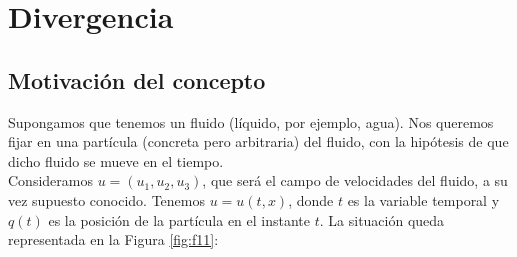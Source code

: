 \newpage

\section{Divergencia}\label{section:div}

\subsection{Motivación del concepto}

Supongamos que tenemos un fluido (líquido, por ejemplo, agua). Nos queremos fijar en una partícula (concreta pero arbitraria) 
del fluido, con la hipótesis de que dicho fluido se mueve en el tiempo. \\

Consideramos $u = (u_1, u_2, u_3)$, que será el campo de velocidades del fluido, a su vez supuesto conocido. Tenemos
$u = u(t,x)$, donde $t$ es la variable temporal y $q(t)$ es la posición de la partícula en el instante $t$. 
La situación queda representada en la Figura \ref{fig:f11}:

